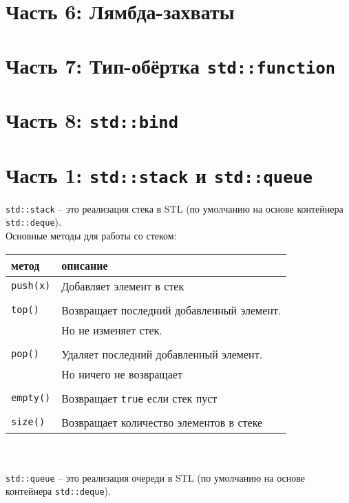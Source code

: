 \documentclass{article}
\begin{document}
\section*{Часть 6: Лямбда-захваты}

\section*{Часть 7: Тип-обёртка \texttt{std::function}}

\section*{Часть 8: \texttt{std::bind}}

\iffalse
\section*{Часть 1: \texttt{std::stack} и \texttt{std::queue}}

\texttt{std::stack} -- это реализация стека в STL (по умолчанию на основе контейнера \texttt{std::deque}).\\

Основные методы для работы со стеком:

\begin{tabular}{ l | l } 
 метод & описание \\ \hline
 \texttt{push(x)}  & Добавляет элемент в стек\\ \\\hline
 \texttt{top()}    & Возвращает последний добавленный элемент.  \\ 
                   & Но не изменяет стек. \\\\ \hline
 \texttt{pop()}    & Удаляет последний добавленный элемент. \\
                   & Но ничего не возвращает\\ \\ \hline
 \texttt{empty()}  & Возвращает \texttt{true} если стек пуст \\ \\\hline
 \texttt{size()}   & Возвращает количество элементов в стеке \\ \hline
\end{tabular}\\
\\

\texttt{std::queue} -- это реализация очереди в STL (по умолчанию на основе контейнера \texttt{std::deque}).\\
\end{document}
